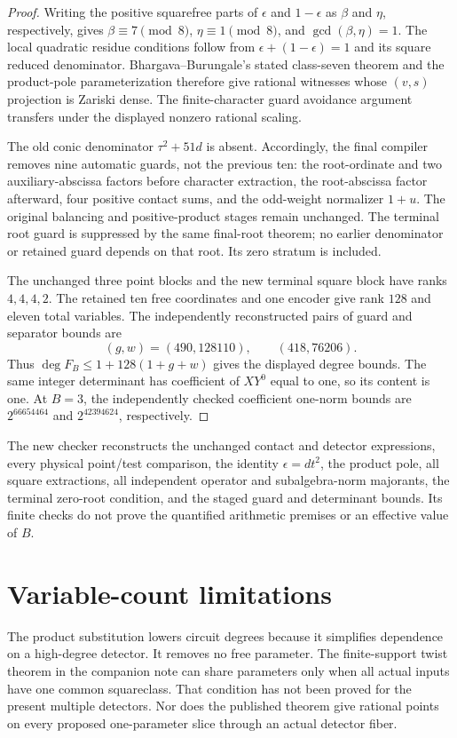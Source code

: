 \documentclass[11pt]{article}
\begin{document}
\begin{proof}
Writing the positive squarefree parts of $\epsilon$ and $1-\epsilon$
as $\beta$ and $\eta$, respectively, gives
$\beta\equiv7\pmod8$, $\eta\equiv1\pmod8$, and
$\gcd(\beta,\eta)=1$. The local quadratic residue conditions follow
from $\epsilon+(1-\epsilon)=1$ and its square reduced denominator.
Bhargava--Burungale's stated class-seven theorem and the product-pole
parameterization therefore give rational witnesses whose $(v,s)$
projection is Zariski dense. The finite-character guard avoidance
argument transfers under the displayed nonzero rational scaling.

The old conic denominator $\tau^2+51d$ is absent. Accordingly, the final
compiler removes nine automatic guards, not the previous ten: the
root-ordinate and two auxiliary-abscissa factors before character
extraction, the root-abscissa factor afterward, four positive contact
sums, and the odd-weight normalizer $1+u$. The original balancing and
positive-product stages remain unchanged. The terminal root guard is
suppressed by the same final-root theorem; no earlier denominator or
retained guard depends on that root. Its zero stratum is included.

The unchanged three point blocks and the new terminal square block have
ranks $4,4,4,2$. The retained ten free coordinates and one encoder give
rank $128$ and eleven total variables. The independently reconstructed
pairs of guard and separator bounds are
\[
 (g,w)=(490,128110),\qquad (418,76206).
\]
Thus $\deg F_B\le1+128(1+g+w)$ gives the displayed degree bounds.
The same integer determinant has coefficient of $XY^0$ equal to one,
so its content is one. At $B=3$, the independently checked coefficient
one-norm bounds are
$2^{66654464}$ and $2^{42394624}$, respectively.
\end{proof}

The new checker reconstructs the unchanged contact and detector
expressions, every physical point/test comparison, the identity
$\epsilon=dt^2$, the product pole, all square extractions, all independent
operator and subalgebra-norm majorants, the terminal zero-root condition,
and the staged guard and determinant bounds. Its finite checks do not
prove the quantified arithmetic premises or an effective value of $B$.

\section{Variable-count limitations}
The product substitution lowers circuit degrees because it simplifies
dependence on a high-degree detector. It removes no free parameter.
The finite-support twist theorem in the companion note can share
parameters only when all actual inputs have one common squareclass.
That condition has not been proved for the present multiple detectors.
Nor does the published theorem give rational points on every proposed
one-parameter slice through an actual detector fiber.
\end{document}
